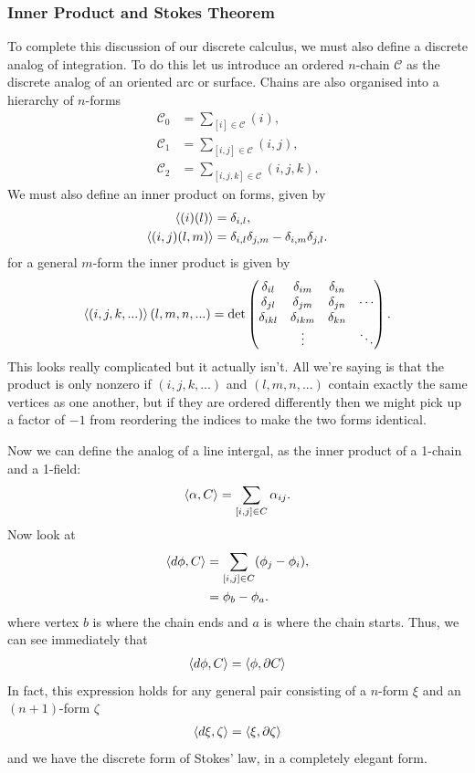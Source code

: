 \documentclass[11pt, oneside]{article} %
\numberwithin{equation}{section}
\begin{document}
\subsubsection{Inner Product and Stokes Theorem}

To complete this discussion of our discrete calculus, we must also define a discrete analog of integration. To do this let us introduce an ordered $n$-chain $\mathcal C$ as the discrete analog of an oriented arc or surface. Chains are also organised into a hierarchy of $n$-forms
\begin{align}
    \mathcal C_0 &= \sum_{[i]\in \mathcal C} (i), \\
    \mathcal C_1 &= \sum_{[i,j]\in \mathcal C} (i,j), \\
    \mathcal C_2 &= \sum_{[i,j,k]\in \mathcal C} (i,j,k).
\end{align}
We must also define an inner product on forms, given by
\begin{align}
    \left \langle (i)(l) \right \rangle & = \delta_{i,l},\\
    \left \langle (i,j)(l,m) \right \rangle & = \delta_{i,l}\delta_{j,m} -\delta_{i,m}\delta_{j,l}.
\end{align}
for a general $m$-form the inner product is given by
\begin{align}
    \left \langle (i,j,k,...) \right \rangle{(l,m,n,...)} = \textup{det}\begin{pmatrix}
        \delta_{il} & \delta_{im} & \delta_{in}\\
        \delta_{jl} & \delta_{jm} & \delta_{jn}& \cdots\\
        \delta_{ikl} & \delta_{ikm} & \delta_{kn}\\
        & \vdots & & \ddots
    \end{pmatrix}.
\end{align}
This looks really complicated but it actually isn't. All we're saying is that the product is only nonzero if $(i,j,k,...)$ and $(l,m,n,...)$ contain exactly the same vertices as one another, but if they are ordered differently then we might pick up a factor of $-1$ from reordering the indices to make the two forms identical. 

Now we can define the analog of a line intergal, as the inner product of a 1-chain and a 1-field:
\begin{align}
    \left \langle \alpha, C \right \rangle = \sum_{[i,j]\in C} \alpha_{ij}.
\end{align}
Now look at 
\begin{align}
    \left \langle d\phi, C \right \rangle &= \sum_{[i,j]\in C}(\phi_j - \phi_i),\\
    & = \phi_b - \phi_a.
\end{align}
where vertex $b$ is where the chain ends and $a$ is where the chain starts. Thus, we can see immediately that
\begin{align}
    \left \langle d \phi, C \right \rangle = \left \langle \phi, \partial C \right \rangle
\end{align}
In fact, this expression holds for any general pair consisting of a $n$-form $\xi$ and an $(n+1)$-form $\zeta$
\begin{align}
    \left \langle d\xi, \zeta \right \rangle = \left \langle \xi, \partial \zeta \right \rangle
\end{align}
and we have the discrete form of Stokes' law, in a completely elegant form.
\end{document}
